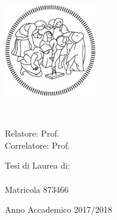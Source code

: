 \begin{titlepage}
    \begin{addmargin}[-1cm]{-3cm}
    \begin{center}
        \large
		\myUni \\
		\myFaculty \\
		\myDepartment \\ \bigskip
		\includegraphics[width=4cm]{gfx/logo} \\ \bigskip
        \vfill

        \begingroup
            \spacedallcaps{\myTitle} \\ \bigskip
        \endgroup
	\end{center}
	\vfill
	\begin{flushleft}
		Relatore: Prof. \myProf\\\medskip
		Correlatore: Prof. \myOtherProf
	\end{flushleft}
	\vfill
	\begin{flushright}
		Tesi di Laurea di:\\
		\myName\\
		Matricola 873466
	\end{flushright}
	\vfill
	\begin{center}
		Anno Accademico 2017/2018
	\end{center}
        

  \end{addmargin}
\end{titlepage}

